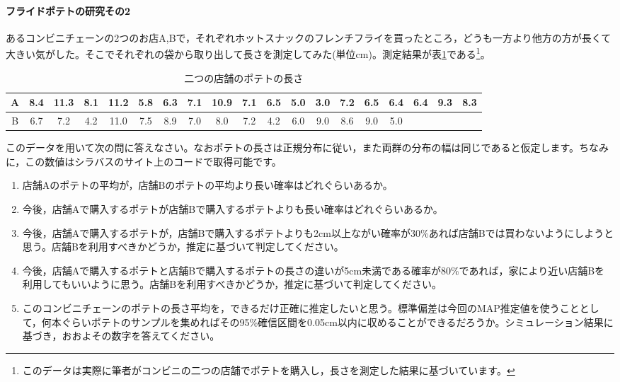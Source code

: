 \documentclass{ltjsbook}
\begin{document}
\paragraph{フライドポテトの研究その2}
あるコンビニチェーンの2つのお店A,Bで，それぞれホットスナックのフレンチフライを買ったところ，どうも一方より他方の方が長くて大きい気がした。そこでそれぞれの袋から取り出して長さを測定してみた(単位cm)。測定結果が表\ref{tab:20_01}である\footnote{このデータは実際に筆者がコンビニの二つの店舗でポテトを購入し，長さを測定した結果に基づいています。}。
\begin{table}[ht]
	\center
	\caption{二つの店舗のポテトの長さ}
	\begin{tabular}{c|cccccccccccccccccc}\hline
		A & 8.4 & 11.3 & 8.1 & 11.2 & 5.8 & 6.3 & 7.1 & 10.9 & 7.1 & 6.5 & 5.0 & 3.0 & 7.2 & 6.5 & 6.4 & 6.4 & 9.3 & 8.3 \\\hline
		B & 6.7 & 7.2  & 4.2 & 11.0 & 7.5 & 8.9 & 7.0 & 8.0  & 7.2 & 4.2 & 6.0 & 9.0 & 8.6 & 9.0 & 5.0 &     &     &     \\\hline
	\end{tabular}
	\label{tab:20_01}
\end{table}
このデータを用いて次の問に答えなさい。なおポテトの長さは正規分布に従い，また両群の分布の幅は同じであると仮定します。ちなみに，この数値はシラバスのサイト上のコードで取得可能です。
\begin{enumerate}
	\item 店舗Aのポテトの平均が，店舗Bのポテトの平均より長い確率はどれぐらいあるか。
	\item 今後，店舗Aで購入するポテトが店舗Bで購入するポテトよりも長い確率はどれぐらいあるか。
	\item 今後，店舗Aで購入するポテトが，店舗Bで購入するポテトよりも2cm以上ながい確率が30\%あれば店舗Bでは買わないようにしようと思う。店舗Bを利用すべきかどうか，推定に基づいて判定してください。
	\item 今後，店舗Aで購入するポテトと店舗Bで購入するポテトの長さの違いが5cm未満である確率が80\%であれば，家により近い店舗Bを利用してもいいように思う。店舗Bを利用すべきかどうか，推定に基づいて判定してください。
	\item このコンビニチェーンのポテトの長さ平均を，できるだけ正確に推定したいと思う。標準偏差は今回のMAP推定値を使うこととして，何本ぐらいポテトのサンプルを集めればその95\%確信区間を0.05cm以内に収めることができるだろうか。シミュレーション結果に基づき，おおよその数字を答えてください。
\end{enumerate}
\end{document}
